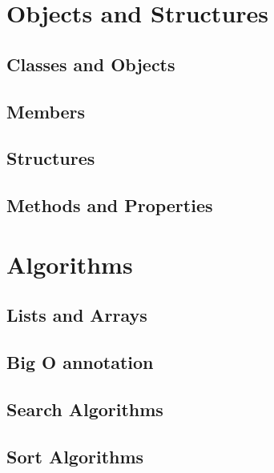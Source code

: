 \documentclass[
]{book}
\begin{document}
\hypertarget{objects-and-structures}{%
\chapter{Objects and Structures}\label{objects-and-structures}}

\hypertarget{classes-and-objects}{%
\section{Classes and Objects}\label{classes-and-objects}}

\hypertarget{members}{%
\section{Members}\label{members}}

\hypertarget{structures}{%
\section{Structures}\label{structures}}

\hypertarget{methods-and-properties}{%
\section{Methods and Properties}\label{methods-and-properties}}

\hypertarget{algorithms}{%
\chapter{Algorithms}\label{algorithms}}

\hypertarget{lists-and-arrays}{%
\section{Lists and Arrays}\label{lists-and-arrays}}

\hypertarget{big-o-annotation}{%
\section{Big O annotation}\label{big-o-annotation}}

\hypertarget{search-algorithms}{%
\section{Search Algorithms}\label{search-algorithms}}

\hypertarget{sort-algorithms}{%
\section{Sort Algorithms}\label{sort-algorithms}}
\end{document}
